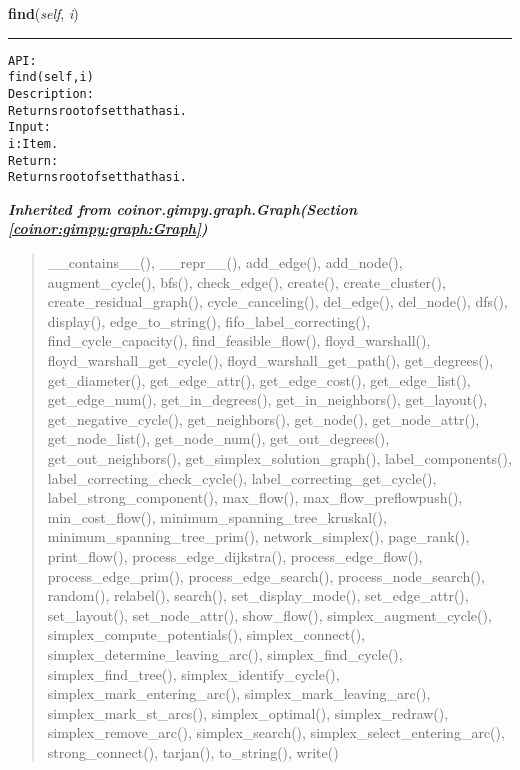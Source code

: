     \vspace{0.5ex}

\hspace{.8\funcindent}\begin{boxedminipage}{\funcwidth}

    \raggedright \textbf{find}(\textit{self}, \textit{i})

    \vspace{-1.5ex}

    \rule{\textwidth}{0.5\fboxrule}
\setlength{\parskip}{2ex}
\begin{alltt}

API:
    find(self, i)
Description:
    Returns root of set that has i.
Input:
    i: Item.
Return:
    Returns root of set that has i.
\end{alltt}

\setlength{\parskip}{1ex}
    \end{boxedminipage}


\large{\textbf{\textit{Inherited from coinor.gimpy.graph.Graph\textit{(Section \ref{coinor:gimpy:graph:Graph})}}}}

\begin{quote}
\_\_contains\_\_(), \_\_repr\_\_(), add\_edge(), add\_node(), augment\_cycle(), bfs(), check\_edge(), create(), create\_cluster(), create\_residual\_graph(), cycle\_canceling(), del\_edge(), del\_node(), dfs(), display(), edge\_to\_string(), fifo\_label\_correcting(), find\_cycle\_capacity(), find\_feasible\_flow(), floyd\_warshall(), floyd\_warshall\_get\_cycle(), floyd\_warshall\_get\_path(), get\_degrees(), get\_diameter(), get\_edge\_attr(), get\_edge\_cost(), get\_edge\_list(), get\_edge\_num(), get\_in\_degrees(), get\_in\_neighbors(), get\_layout(), get\_negative\_cycle(), get\_neighbors(), get\_node(), get\_node\_attr(), get\_node\_list(), get\_node\_num(), get\_out\_degrees(), get\_out\_neighbors(), get\_simplex\_solution\_graph(), label\_components(), label\_correcting\_check\_cycle(), label\_correcting\_get\_cycle(), label\_strong\_component(), max\_flow(), max\_flow\_preflowpush(), min\_cost\_flow(), minimum\_spanning\_tree\_kruskal(), minimum\_spanning\_tree\_prim(), network\_simplex(), page\_rank(), print\_flow(), process\_edge\_dijkstra(), process\_edge\_flow(), process\_edge\_prim(), process\_edge\_search(), process\_node\_search(), random(), relabel(), search(), set\_display\_mode(), set\_edge\_attr(), set\_layout(), set\_node\_attr(), show\_flow(), simplex\_augment\_cycle(), simplex\_compute\_potentials(), simplex\_connect(), simplex\_determine\_leaving\_arc(), simplex\_find\_cycle(), simplex\_find\_tree(), simplex\_identify\_cycle(), simplex\_mark\_entering\_arc(), simplex\_mark\_leaving\_arc(), simplex\_mark\_st\_arcs(), simplex\_optimal(), simplex\_redraw(), simplex\_remove\_arc(), simplex\_search(), simplex\_select\_entering\_arc(), strong\_connect(), tarjan(), to\_string(), write()
\end{quote}

